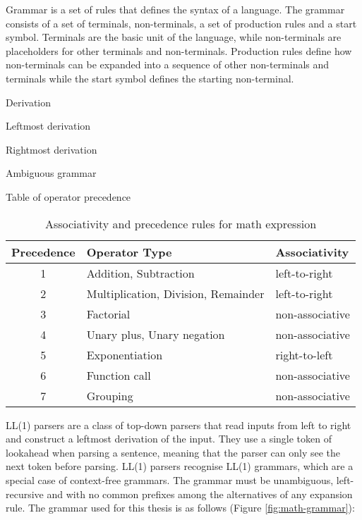 Grammar is a set of rules that defines the syntax of a language. The grammar consists of a set of terminals, non-terminals, a set of production rules and a start symbol. Terminals are the basic unit of the language, while non-terminals are placeholders for other terminals and non-terminals. Production rules define how non-terminals can be expanded into a sequence of other non-terminals and terminals while the start symbol defines the starting non-terminal.

Derivation

Leftmost derivation

Rightmost derivation

Ambiguous grammar

Table of operator precedence


\begin{table}[h]
  \centering
  \begin{tabular}{|c|l|l|}
    \hline
    \textbf{Precedence} & \textbf{Operator Type}              & \textbf{Associativity} \\ \hline
    1                   & Addition, Subtraction               & left-to-right          \\ \hline
    2                   & Multiplication, Division, Remainder & left-to-right          \\ \hline
    3                   & Factorial                           & non-associative        \\ \hline
    4                   & Unary plus, Unary negation          & non-associative        \\ \hline
    5                   & Exponentiation                      & right-to-left          \\ \hline
    6                   & Function call                       & non-associative        \\ \hline
    7                   & Grouping                            & non-associative        \\ \hline
  \end{tabular}
  \caption{Associativity and precedence rules for math expression}
  \label{table:associativity}
\end{table}


LL(1) parsers are a class of top-down parsers that read inputs from left to right and construct a leftmost derivation of the input. They use a single token of lookahead when parsing a sentence, meaning that the parser can only see the next token before parsing. LL(1) parsers recognise LL(1) grammars, which are a special case of context-free grammars. The grammar must be unambiguous, left-recursive and with no common prefixes among the alternatives of any expansion rule. The grammar used for this thesis is as follows (Figure \ref{fig:math-grammar}):

